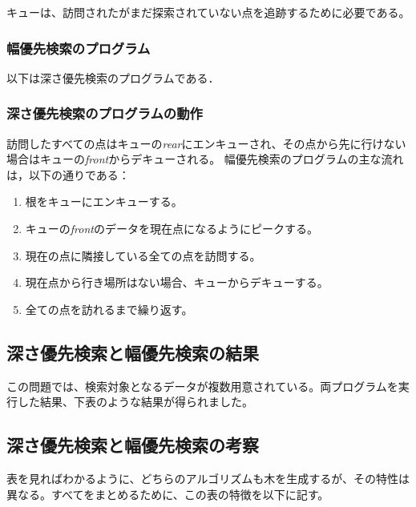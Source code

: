 \documentclass[a4j, titlepage]{jarticle}
\begin{document}
    キューは、訪問されたがまだ探索されていない点を追跡するために必要である。

        \subsubsection{幅優先検索のプログラム}
        以下は深さ優先検索のプログラムである．
        
        \subsubsection{深さ優先検索のプログラムの動作}
        訪問したすべての点はキューの\textit{rear}にエンキューされ、その点から先に行けない場合はキューの\textit{front}からデキューされる。
        幅優先検索のプログラムの主な流れは，以下の通りである：
        \begin{screen}
            \begin{enumerate}
                \item 根をキューにエンキューする。
                \item キューの\textit{front}のデータを現在点になるようにピークする。
                \item 現在の点に隣接している全ての点を訪問する。
                \item 現在点から行き場所はない場合、キューからデキューする。
                \item 全ての点を訪れるまで繰り返す。
            \end{enumerate}
        \end{screen}
        
    \subsection{深さ優先検索と幅優先検索の結果}
    この問題では、検索対象となるデータが複数用意されている。両プログラムを実行した結果、下表のような結果が得られました。

    \subsection{深さ優先検索と幅優先検索の考察}
    表を見ればわかるように、どちらのアルゴリズムも木を生成するが、その特性は異なる。すべてをまとめるために、この表の特徴を以下に記す。
\end{document}
